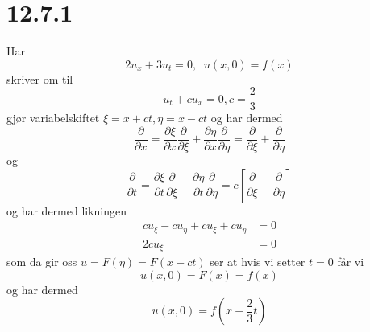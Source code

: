 \documentclass{report}
\newcommand{\nbrack}[1]{\left( #1 \right)}
\newcommand{\bbrack}[1]{\left[ #1 \right]}
\begin{document}
\section*{12.7.1}
Har
\begin{equation}
  \label{eq:35}
  2 u_{x} + 3u_{t} = 0, \;\; u(x, 0) = f(x)
\end{equation}
skriver om til
\begin{equation}
  \label{eq:51}
  u_{t} + cu_{x} = 0, c = \frac{2}{3}
\end{equation}
gjør variabelskiftet $\xi = x + ct, \eta = x - ct$ og har dermed
\begin{equation}
  \label{eq:52}
  \frac{\partial}{\partial x}
  = \frac{\partial \xi}{\partial x} \frac{\partial}{\partial \xi} + \frac{\partial \eta}{\partial x} \frac{\partial}{\partial \eta}
  = \frac{\partial}{\partial \xi} + \frac{\partial}{\partial \eta}
\end{equation}
og
\begin{equation}
  \label{eq:53}
  \frac{\partial}{\partial t}
  = \frac{\partial \xi}{\partial t} \frac{\partial}{\partial \xi} + \frac{\partial \eta}{\partial t} \frac{\partial}{\partial \eta}
  = c\bbrack{ \frac{\partial}{\partial \xi} - \frac{\partial}{\partial\eta} }
\end{equation}
og har dermed likningen
\begin{equation}
  \label{eq:54}
  \begin{split}
    cu_{\xi} - cu_{\eta} + cu_{\xi} + cu_{\eta} &= 0 \\
    2cu_{\xi} &= 0
  \end{split}
\end{equation}
som da gir oss $u = F(\eta) = F(x - ct)$ ser at hvis vi setter $t=0$ får vi
\begin{equation}
  \label{eq:56}
  u(x, 0) = F(x) = f(x)
\end{equation}
og har dermed
\begin{equation}
  \label{eq:57}
  u(x, 0) = f\nbrack{ x - \frac{2}{3}t }
\end{equation}
\end{document}
